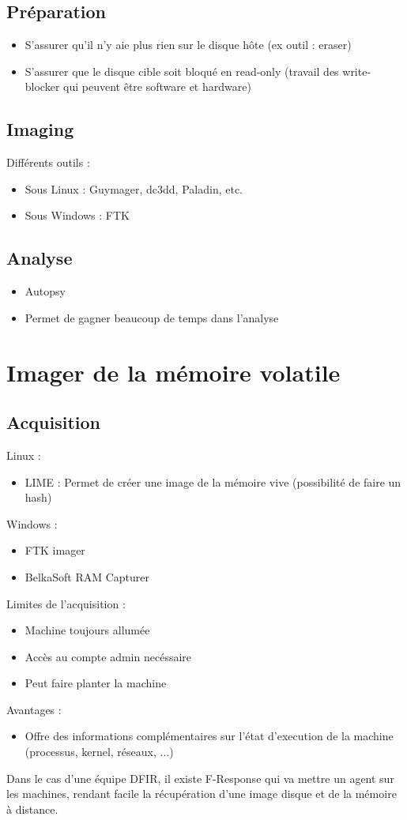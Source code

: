 \documentclass[a4paper]{article}
\begin{document}
\subsection{Préparation}
\begin{itemize}
    \item S'assurer qu'il n'y aie plus rien sur le disque hôte (ex outil : eraser)
    \item S'assurer que le disque cible soit bloqué en read-only (travail des write-blocker qui peuvent être software et hardware)
\end{itemize}
\subsection{Imaging}
Différents outils :
\begin{itemize}
    \item Sous Linux : Guymager, dc3dd, Paladin, etc. 
    \item Sous Windows : FTK
\end{itemize}
\subsection{Analyse}
\begin{itemize}
    \item Autopsy
    \item Permet de gagner beaucoup de temps dans l'analyse
\end{itemize}
\newpage

\section{Imager de la mémoire volatile}
\subsection{Acquisition}
Linux :
\begin{itemize}
    \item LIME : Permet de créer une image de la mémoire vive (possibilité de faire un hash)
\end{itemize}
Windows :
\begin{itemize}
    \item FTK imager
    \item BelkaSoft RAM Capturer
\end{itemize}
Limites de l'acquisition :
\begin{itemize}
    \item Machine toujours allumée
    \item Accès au compte admin necéssaire
    \item Peut faire planter la machine
\end{itemize}
Avantages : 
\begin{itemize}
    \item Offre des informations complémentaires sur l'état d'execution de la machine (processus, kernel, réseaux, ...)
\end{itemize}
Dans le cas d'une équipe DFIR, il existe F-Response qui va mettre un agent sur les machines, rendant facile la récupération d'une image disque et de la mémoire à distance.
\end{document}
